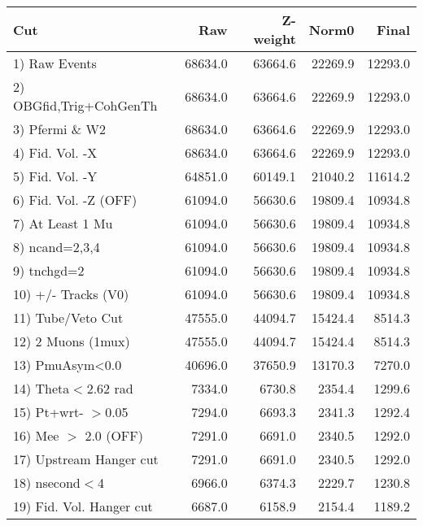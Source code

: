  \begin{table}[h!]\centering
 \begin{tabular}{||l||r|r|r|r||}
 \hline
 \hline
 Cut & Raw & Z-weight & Norm0 & Final \\
 \hline
  1) Raw Events           &     68634.0 &     63664.6 &     22269.9 &     12293.0 \\
  2) OBGfid,Trig+CohGenTh &     68634.0 &     63664.6 &     22269.9 &     12293.0 \\
  3) Pfermi \& W2         &     68634.0 &     63664.6 &     22269.9 &     12293.0 \\
  4) Fid. Vol. -X         &     68634.0 &     63664.6 &     22269.9 &     12293.0 \\
  5) Fid. Vol. -Y         &     64851.0 &     60149.1 &     21040.2 &     11614.2 \\
  6) Fid. Vol. -Z (OFF)   &     61094.0 &     56630.6 &     19809.4 &     10934.8 \\
  7) At Least 1 Mu        &     61094.0 &     56630.6 &     19809.4 &     10934.8 \\
  8) ncand=2,3,4          &     61094.0 &     56630.6 &     19809.4 &     10934.8 \\
  9) tnchgd=2             &     61094.0 &     56630.6 &     19809.4 &     10934.8 \\
 10) +/- Tracks (V0)      &     61094.0 &     56630.6 &     19809.4 &     10934.8 \\
 11) Tube/Veto Cut        &     47555.0 &     44094.7 &     15424.4 &      8514.3 \\
 12) 2 Muons (1mux)       &     47555.0 &     44094.7 &     15424.4 &      8514.3 \\
 13) PmuAsym<0.0          &     40696.0 &     37650.9 &     13170.3 &      7270.0 \\
 14) Theta$<$2.62 rad     &      7334.0 &      6730.8 &      2354.4 &      1299.6 \\
 15) Pt+wrt- $>$0.05      &      7294.0 &      6693.3 &      2341.3 &      1292.4 \\
 16) Mee $>$ 2.0  (OFF)   &      7291.0 &      6691.0 &      2340.5 &      1292.0 \\
 17) Upstream Hanger cut  &      7291.0 &      6691.0 &      2340.5 &      1292.0 \\
 18) nsecond$<$4          &      6966.0 &      6374.3 &      2229.7 &      1230.8 \\
 19) Fid. Vol. Hanger cut &      6687.0 &      6158.9 &      2154.4 &      1189.2 \\

\end{tabular}
\end{table}
